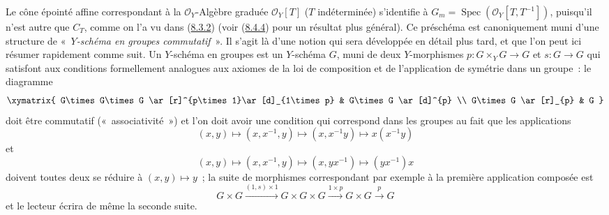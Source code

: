 \begin{remark}[8.3.9]
\label{II.8.3.9-fr}
Le cône épointé affine correspondant à la $\mathcal{O}_Y$-Algèbre graduée
$\mathcal{O}_Y[T]$ ($T$ indéterminée) s'identifie à
$G_m=\operatorname{Spec}(\mathcal{O}_Y[T,T^{-1}])$, puisqu'il n'est autre que
$C_T$, comme on l'a vu dans (\hyperref[II.8.3.2-fr]{8.3.2}) (voir
(\hyperref[II.8.4.4-fr]{8.4.4}) pour un résultat plus général). Ce préschéma
est canoniquement muni d'une structure de «~\emph{$Y$-schéma en groupes
commutatif}~». Il s'agit là d'une notion qui sera développée en détail plus
tard, et que l'on peut ici résumer rapidement comme suit. Un $Y$-schéma en
groupes est un $Y$-schéma $G$, muni de deux $Y$-morphismes
$p:G\times_YG\to G$ et $s:G\to G$ qui satisfont aux conditions formellement
analogues aux axiomes de la loi de composition et de l'application de
symétrie dans un groupe~: le diagramme
\[
  \xymatrix{
    G\times G\times G \ar[r]^{p\times1}\ar[d]_{1\times p}
      & G\times G \ar[d]^{p} \\
    G\times G \ar[r]_{p} & G
  }
\]
doit être commutatif («~associativité~») et l'on doit avoir une condition qui
correspond dans les groupes au fait que les applications
\[
  (x,y)\mapsto(x,x^{-1},y)\mapsto(x,x^{-1}y)\mapsto x(x^{-1}y)
\]
et
\[
  (x,y)\mapsto(x,x^{-1},y)\mapsto(x,yx^{-1})\mapsto(yx^{-1})x
\]
doivent toutes deux se réduire à $(x,y)\mapsto y$~; la suite de morphismes
correspondant par exemple à la première application composée est
\[
  G\times G\xrightarrow{(1,s)\times1}G\times G\times G
  \xrightarrow{1\times p}G\times G\xrightarrow{p}G
\]
et le lecteur écrira de même la seconde suite.


\end{remark}
